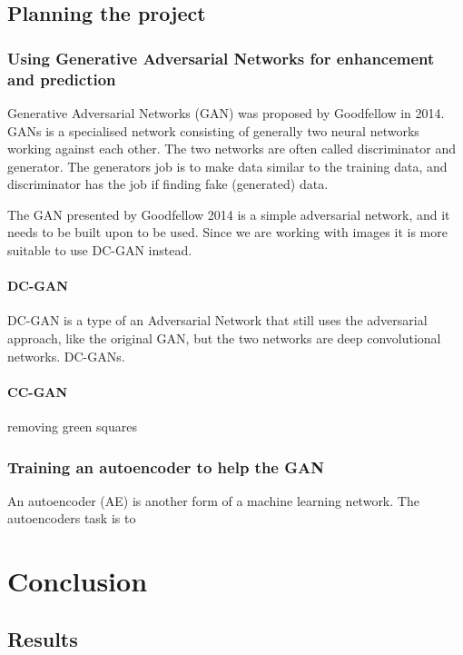 \documentclass[a4paper,english]{ifimaster}
\begin{document}
\chapter{Planning the project}
\section{Using Generative Adversarial Networks for enhancement and prediction}
Generative Adversarial Networks (GAN) was proposed by Goodfellow in 2014. \cite{GoodfellowGAN} %
GANs is a specialised network consisting of generally two neural networks working against each other. 
The two networks are often called discriminator and generator. The generators job is to make data similar to the training data, and discriminator has the job if finding fake (generated) data.

The GAN presented by Goodfellow 2014\cite{GoodfellowGAN} is a simple adversarial network, and it needs to be built upon to be used. Since we are working with images it is more suitable to use
DC-GAN instead. 

\subsection{DC-GAN}
  DC-GAN is a type of an Adversarial Network that still uses the adversarial approach, like the original GAN, but the two networks are deep convolutional networks. DC-GANs.
\subsection{CC-GAN}
  removing green squares

\section{Training an autoencoder to help the GAN}
An autoencoder (AE) is another form of a machine learning network. The autoencoders task is to  

\part{Conclusion}

\chapter{Results}

\backmatter{}

\printbibliography
\end{document}
